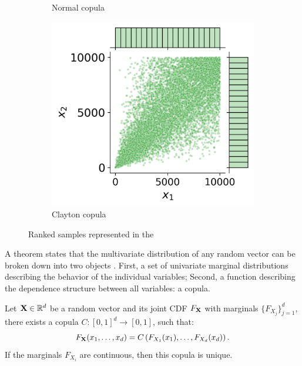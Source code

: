 \begin{figure}[ht]
\begin{subfigure}[b]{0.32\textwidth}
        \caption{Normal copula}
    \end{subfigure}
    \hfill
    \begin{subfigure}[b]{0.32\textwidth}
        \centering
        \includegraphics[width=\textwidth]{../numerical_experiments/chapter1/figures/clayton_copula_ranked.png}
        \caption{Clayton copula}
    \end{subfigure}
       \caption{Ranked samples represented in the }
       \label{fig:ranked_joint_dist_samples}
\end{figure}

A theorem states that the multivariate distribution of any random vector can be broken down into two objects \citep{joe_1997}. 
First, a set of univariate marginal distributions describing the behavior of the individual variables;
Second, a function describing the dependence structure between all variables: a copula. 

\begin{theorem}
    Let $\mathbf{X} \in \mathbb{R}^d$ be a random vector and its joint CDF $F_{{\bf X}}$ with marginals $\{F_{X_j}\}_{j=1}^d$, there exists a copula $C: [0, 1]^d \rightarrow [0, 1]$, such that:
    \begin{equation}
        F_{{\bf X}}(x_1, \dots, x_d) = C\left(F_{X_1}(x_1), \dots, F_{X_d}(x_d)\right). 
    \end{equation}
    If the marginals $F_{X_i}$ are continuous, then this copula is unique.
    \label{thm:sklar}
\end{theorem}

